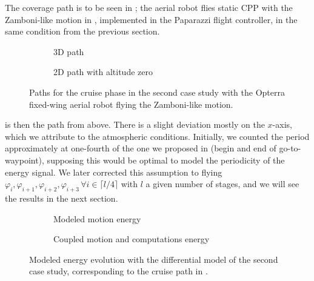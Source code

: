 The coverage path is to be seen in ; the aerial robot flies static CPP with the Zamboni-like motion in , implemented in the Paparazzi flight controller, in the same condition from the previous section. 
\begin{figure}[h!]
  \centering
  \selectfont
  \footnotesize
  \begin{subfigure}[c]{0.475\textwidth}
    \centering
    
    \caption{3D path}
    \label{fig:cruise-path}
  \end{subfigure}
  \begin{subfigure}[c]{0.475\textwidth}
    \centering
    
    \vspace*{1.1ex}
    \caption{2D path with altitude zero}
    \label{fig:cruise-xy}
  \end{subfigure}
  \caption[Paths for the cruise phase in the second case study]{Paths for the cruise phase in the second case study with the Opterra fixed-wing aerial robot flying the Zamboni-like motion.}
  \label{fig:cruise-prelim}
\end{figure}
 is then the path from above. There is a slight deviation mostly on the $x$-axis, which we attribute to the atmospheric conditions. Initially, we counted the period approximately at one-fourth of the one we proposed in  (begin and end of go-to-waypoint), supposing this would be optimal to model the periodicity of the energy signal. We later corrected this assumption to flying $\varphi_{i},\varphi_{i+1},\varphi_{i+2},\varphi_{i+3}\,\forall i\in\lceil l/4\rceil$ with $l$ a given number of stages, and we will see the results in the next section. 
\begin{figure}[h!]
  \centering
  \selectfont
  \footnotesize
  \begin{subfigure}[c]{0.43\textwidth}
    \centering
    
    \caption{Modeled motion energy}
    \label{fig:cruise-energy}
  \end{subfigure}
  \begin{subfigure}[c]{0.45\textwidth}
    \centering
    
    \caption{Coupled motion and computations energy}
    \label{fig:cruise-merge}
  \end{subfigure}
  \caption[Modeled energy evolution with the differential of the second case study]{Modeled energy evolution with the differential model of the second case study, corresponding to the cruise path in .}
  \label{fig:cruise-energies}
\end{figure}
